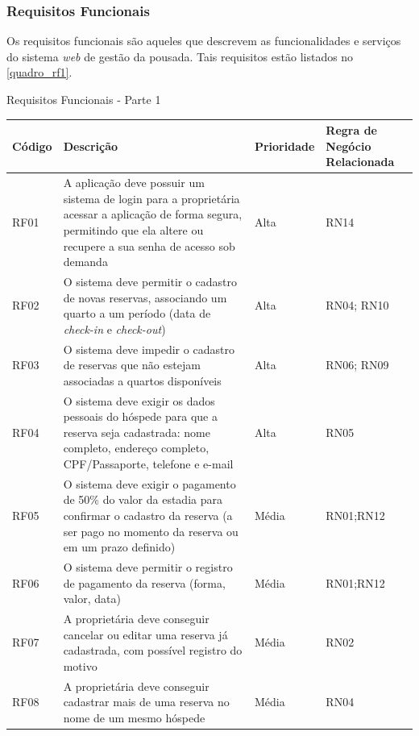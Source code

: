 \documentclass[
	12pt,				%
	openany,			%
	oneside,			%
	a4paper,			%
	english,			%
	french,				%
	spanish,			%
	brazil				%
	]{abntex2}
\begin{document}
\subsubsection{Requisitos Funcionais}
Os requisitos funcionais são aqueles que descrevem as funcionalidades e serviços do sistema \textit{web} de gestão da pousada. Tais requisitos estão listados no \autoref{quadro_rf1}.
%
\begin{quadro}[H]
	\caption{Requisitos Funcionais - Parte 1}
	\label{quadro_rf1}
	\begin{tabular}{|>{\centering\arraybackslash}p{1.5cm}|p{6.7cm}|>{\centering\arraybackslash}p{2cm}|>{\centering\arraybackslash}p{4cm}|}
		\hline
		\textbf{Código} & \textbf{Descrição} & \textbf{Prioridade} & \textbf{Regra de Negócio Relacionada} \\ \hline
		RF01 & A aplicação deve possuir um sistema de login para a proprietária acessar a aplicação de forma segura, permitindo que ela altere ou recupere a sua senha de acesso sob demanda & Alta & RN14 \\ \hline
		RF02 & O sistema deve permitir o cadastro de novas reservas, associando um quarto a um período (data de \textit{check-in} e \textit{check-out}) & Alta & RN04; RN10 \\ \hline
		RF03 & O sistema deve impedir o cadastro de reservas que não estejam associadas a quartos disponíveis & Alta & RN06; RN09 \\ \hline
		RF04 & O sistema deve exigir os dados pessoais do hóspede para que a reserva seja cadastrada: nome completo, endereço completo, CPF/Passaporte, telefone e e-mail & Alta & RN05 \\ \hline
		RF05 & O sistema deve exigir o pagamento de 50\% do valor da estadia para confirmar o cadastro da reserva (a ser pago no momento da reserva ou em um prazo definido) & Média & RN01;RN12 \\ \hline
		RF06 & O sistema deve permitir o registro de pagamento da reserva (forma, valor, data) & Média & RN01;RN12 \\ \hline
		RF07 & A proprietária deve conseguir cancelar ou editar uma reserva já cadastrada, com possível registro do motivo & Média & RN02 \\ \hline
		RF08 & A proprietária deve conseguir cadastrar mais de uma reserva no nome de um mesmo hóspede & Média & RN04 \\ \hline
	\end{tabular}
\end{quadro}
\end{document}
